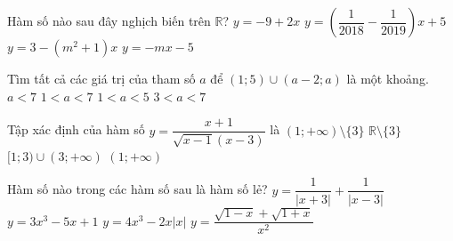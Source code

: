 \begin{ex}%
Hàm số nào sau đây nghịch biến trên $\mathbb{R}$?
\choice
{$y=-9+2x$}
{$y=\left(\dfrac{1}{2018}-\dfrac{1}{2019}\right)x+5$}
{\True $y=3-(m^2+1)x$}
{$y=-mx-5$}
\end{ex}


\begin{ex}%
Tìm tất cả các giá trị của tham số $a$ để $(1;5)\cup (a-2;a)$ là một khoảng.
\choice
{$a<7$}
{\True $1<a<7$}
{$1<a<5$}
{$3<a<7$}
\end{ex}


\begin{ex}%
Tập xác định của hàm số $y=\dfrac{x+1}{\sqrt{x-1}(x-3)}$ là
\choice
{\True $(1;+\infty)\setminus\{3\}$}
{$\mathbb{R}\setminus \{3\}$}
{$[1;3)\cup (3;+\infty)$}
{$(1;+\infty)$}
\end{ex}


\begin{ex}%
Hàm số nào trong các hàm số sau là hàm số lẻ?
\choice
{$y=\dfrac{1}{|x+3|}+\dfrac{1}{|x-3|}$}
{$y=3x^3-5x+1$}
{\True $y=4x^3-2x|x|$}
{$y=\dfrac{\sqrt{1-x}+\sqrt{1+x}}{x^2}$}
\end{ex}


